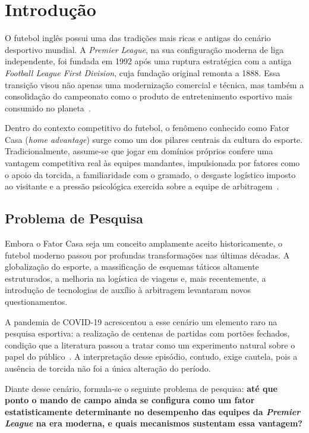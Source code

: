 
\chapter{Introdução}\label{cap:introducao}

O futebol inglês possui uma das tradições mais ricas e antigas do cenário
desportivo mundial. A \textit{Premier League}, na sua configuração moderna de
liga independente, foi fundada em 1992 após uma ruptura estratégica com a antiga
\textit{Football League First Division}, cuja fundação original remonta a 1888.
Essa transição visou não apenas uma modernização comercial e técnica, mas também
a consolidação do campeonato como o produto de entretenimento esportivo mais
consumido no planeta~\cite{PremierLeague2024}.

Dentro do contexto competitivo do futebol, o fenômeno conhecido como Fator Casa
(\textit{home advantage}) surge como um dos pilares centrais da cultura do
esporte. Tradicionalmente, assume-se que jogar em domínios próprios confere uma
vantagem competitiva real às equipes mandantes, impulsionada por fatores como o
apoio da torcida, a familiaridade com o gramado, o desgaste logístico imposto ao
visitante e a pressão psicológica exercida sobre a equipe de
arbitragem~\cite{Courneya1992,Nevill1999}.

\section{Problema de Pesquisa}\label{sec:problema}

Embora o Fator Casa seja um conceito amplamente aceito historicamente, o futebol
moderno passou por profundas transformações nas últimas décadas. A globalização
do esporte, a massificação de esquemas táticos altamente estruturados, a melhoria
na logística de viagens e, mais recentemente, a introdução de tecnologias de
auxílio à arbitragem levantaram novos questionamentos.

A pandemia de COVID-19 acrescentou a esse cenário um elemento raro na pesquisa
esportiva: a realização de centenas de partidas com portões fechados, condição
que a literatura passou a tratar como um experimento natural sobre o papel do
público~\cite{Fischer2021}. A interpretação desse episódio, contudo, exige
cautela, pois a ausência de torcida não foi a única alteração do período.

Diante desse cenário, formula-se o seguinte problema de pesquisa: \textbf{até que
ponto o mando de campo ainda se configura como um fator estatisticamente
determinante no desempenho das equipes da \textit{Premier League} na era moderna,
e quais mecanismos sustentam essa vantagem?}


